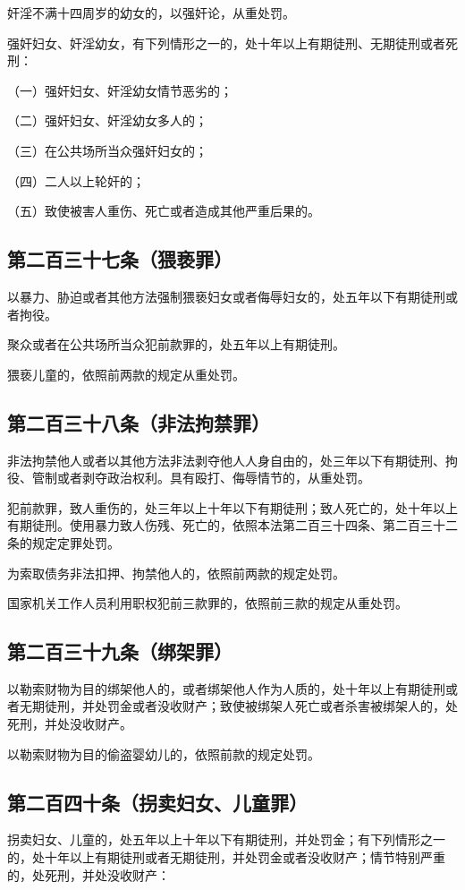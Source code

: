 \documentclass[utf-8,10pt]{ctexart}%
\begin{document}
奸淫不满十四周岁的幼女的，以强奸论，从重处罚。

强奸妇女、奸淫幼女，有下列情形之一的，处十年以上有期徒刑、无期徒刑或者死刑：

（一）强奸妇女、奸淫幼女情节恶劣的；

（二）强奸妇女、奸淫幼女多人的；

（三）在公共场所当众强奸妇女的；

（四）二人以上轮奸的；

（五）致使被害人重伤、死亡或者造成其他严重后果的。
\subsection{第二百三十七条（猥亵罪）}
以暴力、胁迫或者其他方法强制猥亵妇女或者侮辱妇女的，处五年以下有期徒刑或者拘役。

聚众或者在公共场所当众犯前款罪的，处五年以上有期徒刑。

猥亵儿童的，依照前两款的规定从重处罚。
\subsection{第二百三十八条（非法拘禁罪）} 
非法拘禁他人或者以其他方法非法剥夺他人人身自由的，处三年以下有期徒刑、拘役、管制或者剥夺政治权利。具有殴打、侮辱情节的，从重处罚。

犯前款罪，致人重伤的，处三年以上十年以下有期徒刑；致人死亡的，处十年以上有期徒刑。使用暴力致人伤残、死亡的，依照本法第二百三十四条、第二百三十二条的规定定罪处罚。

为索取债务非法扣押、拘禁他人的，依照前两款的规定处罚。

国家机关工作人员利用职权犯前三款罪的，依照前三款的规定从重处罚。
\subsection{第二百三十九条（绑架罪）}
以勒索财物为目的绑架他人的，或者绑架他人作为人质的，处十年以上有期徒刑或者无期徒刑，并处罚金或者没收财产；致使被绑架人死亡或者杀害被绑架人的，处死刑，并处没收财产。

以勒索财物为目的偷盗婴幼儿的，依照前款的规定处罚。
\subsection{第二百四十条（拐卖妇女、儿童罪）} 
拐卖妇女、儿童的，处五年以上十年以下有期徒刑，并处罚金；有下列情形之一的，处十年以上有期徒刑或者无期徒刑，并处罚金或者没收财产；情节特别严重的，处死刑，并处没收财产：
\end{document}
